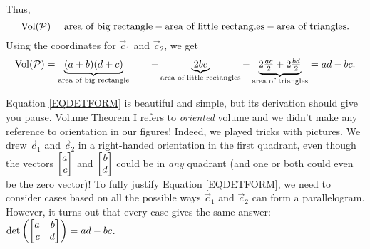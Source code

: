 Thus,
\[
	\operatorname{Vol}(\mathcal P) = \text{area of big rectangle} - \text{area of little rectangles} - \text{area of triangles}.
\]
Using the coordinates for $\vec c_1$ and $\vec c_2$, we get
\begin{equation}
	\label{EQDETFORM}
	\operatorname{Vol}(\mathcal P) = \underbrace{(a+b)(d+c)}_{\text{area of big rectangle}} \qquad -
	\underbrace{2bc}_{\text{area of little rectangles}} -
	\underbrace{2\tfrac{ac}{2} + 2\tfrac{bd}{2}}_{\text{area of triangles}} = ad-bc.
\end{equation}

\begin{center}
\end{center}

Equation \eqref{EQDETFORM} is beautiful and simple, but its derivation should give you pause. Volume Theorem I refers
to \emph{oriented} volume and we didn't make any reference to orientation in our figures! Indeed, we played tricks
with pictures. We drew $\vec c_1$ and $\vec c_2$ in a right-handed orientation in the first quadrant, even though the
vectors $\mat{a\\c}$ and $\mat{b\\d}$ could be in \emph{any} quadrant (and one or both could even be the zero vector)!
To fully justify Equation \eqref{EQDETFORM}, we need to consider cases based on all the possible ways $\vec c_1$ and $\vec c_2$
can form a parallelogram. However, it turns out that every case gives the same answer: $\det\left(\mat{a&b\\c&d}\right)=ad-bc$.

